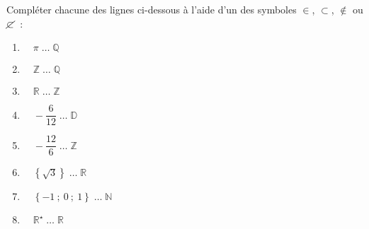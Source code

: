 
%
Compléter chacune des lignes ci-dessous à l'aide d'un des symboles $\in$, $\subset$, $\notin$ ou $\cancel{\subset}$~:
\begin{enumerate}[label=\alph*.]
     \item %
     $\quad \pi \; \ldots \;  \mathbb{Q}$
     \item %
     $\quad \mathbb{Z} \; \ldots \;  \mathbb{Q}$
     \item %
     $\quad \mathbb{R} \; \ldots \;  \mathbb{Z}$
     \item %
     $\quad -\dfrac{6}{12} \; \ldots \;  \mathbb{D}$
     \item %
     $\quad -\dfrac{12}{6} \; \ldots \;  \mathbb{Z}$
     \item %
     $\quad \left\{\sqrt{3}\right\} \; \ldots \;  \mathbb{R}$
     \item %
     $\quad \left\{-1~;~0~;~1\right\} \; \ldots \;  \mathbb{N}$
     \item %
     $\quad \mathbb{R}^\star \; \ldots \;  \mathbb{R}$
\end{enumerate}
